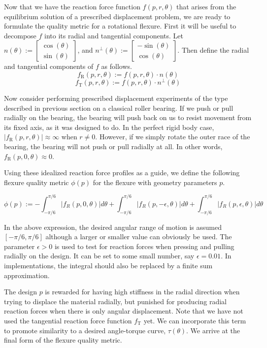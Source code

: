 \documentclass[11pt,letterpaper]{article}
\begin{document}
Now that we have the reaction force function $f(p, r, \theta)$ that arises from the equilibrium solution of a prescribed displacement problem, we are ready to formulate the quality metric for a rotational flexure. First it will be useful to decompose $f$ into its radial and tangential components. Let $n(\theta) := \begin{bmatrix} \cos(\theta) \\ \sin(\theta) \end{bmatrix}$, and $n^\perp(\theta) :=  \begin{bmatrix} -\sin(\theta) \\ \cos(\theta) \end{bmatrix}$. Then define the radial and tangential components of $f$ as follows.
$$f_{\text{R}}(p, r, \theta) := f(p, r, \theta) \cdot n(\theta)$$
$$f_\text{T}(p, r, \theta) := f(p, r, \theta) \cdot n^\perp(\theta)$$

Now consider performing prescribed displacement experiments of the type described in previous section on a classical roller bearing. If we push or pull radially on the bearing, the bearing will push back on us to resist movement from its fixed axis, as it was designed to do. In the perfect rigid body case, $|f_\text{R}(p, r, \theta)| \approx \infty$ when $r \ne 0$. However, if we simply rotate the outer race of the bearing, the bearing will not push or pull radially at all. In other words, $f_\text{R}(p, 0, \theta) \approx 0$.

Using these idealized reaction force profiles as a guide, we define the following flexure quality metric $\phi(p)$ for the flexure with geometry parameters $p$.

$$\phi(p) :=  -\int_{-\pi/6}^{\pi/6} |f_{R}(p, 0, \theta)| d\theta + \int_{-\pi/6}^{\pi/6} |f_{R}(p, - \epsilon, \theta) | d\theta + \int_{-\pi/6}^{\pi/6} |f_{R}(p, \epsilon, \theta)| d\theta$$


In the above expression, the desired angular range of motion is assumed $[-\pi/6, \pi/6]$ although a larger or smaller value can obviously be used. The parameter $\epsilon > 0$ is used to test for reaction forces when pressing and pulling radially on the design. It can be set to some small number, say $\epsilon=0.01$. In implementations, the integral should also be replaced by a finite sum approximation.

The design $p$ is rewarded for having high stiffness in the radial direction when trying to displace the material radially, but punished for producing radial reaction forces when there is only angular displacement. Note that we have not used the tangential reaction force function $f_\text{T}$ yet. We can incorporate this term to promote similarity to a desired angle-torque curve, $\tau(\theta)$. We arrive at the final form of the flexure quality metric.
\end{document}
